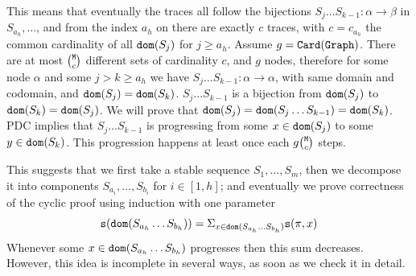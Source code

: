 \documentclass{lmcs}
\begin{document}
This means that eventually the traces all follow the bijections 
$S_j \ldots S_{k-1} : \alpha \rightarrow \beta$ in $S_{a_{h}}, \ldots$,
and from the index $a_h$ on there are exactly $c$ traces, with $c = c_{a_h}$
the common cardinality of all ${\tt dom}(S_j)$ for $j \ge a_{h}$. Assume $g = {\tt Card}({\tt Graph})$.
There are at most $\newton{\MaxInd}{c}$ different sets of
cardinality $c$, and $g$ nodes, therefore for some node $\alpha$ and some 
$j > k \ge a_h$ we have  $S_j \ldots S_{k-1} : \alpha \rightarrow \alpha$,
with same domain and codomain, and 
${\tt dom}(S_j) = {\tt dom}(S_k)$. $S_j \ldots S_{k-1}$ is a bijection from 
${\tt dom}(S_j)$ to ${\tt dom}(S_k) = {\tt dom}(S_j)$.
We will prove that ${\tt dom}(S_j) = {\tt dom}(S_j \ldots S_{k-1}) = {\tt dom}(S_k)$.
PDC implies that $S_j \ldots S_{k-1}$ is progressing from some 
$x \in {\tt dom}(S_j)$ to some $y \in {\tt dom}(S_k)$. This progression happens at least once each 
$g \newton{\MaxInd}{c}$ steps.

This suggests that we first take a stable sequence $S_1, \ldots, S_m$, then we decompose
it into components $S_{a_i}, \ldots, S_{b_i}$ for $i \in [1,h]$;
and eventually we prove correctness of the cyclic proof using induction with one parameter 
$$
{\tt s}({\tt dom}(S_{a_h} \ldots S_{b_h})) 
=
\Sigma_{x \in {\tt dom}(S_{a_h} \ldots S_{b_h})} {\tt s}(\pi,x)
$$ 
Whenever some $x \in {\tt dom}(S_{a_h} \ldots S_{b_h})$ progresses then this sum decreases. 
\\

However, this idea is incomplete in several ways, as soon as we check it in detail.
\end{document}
